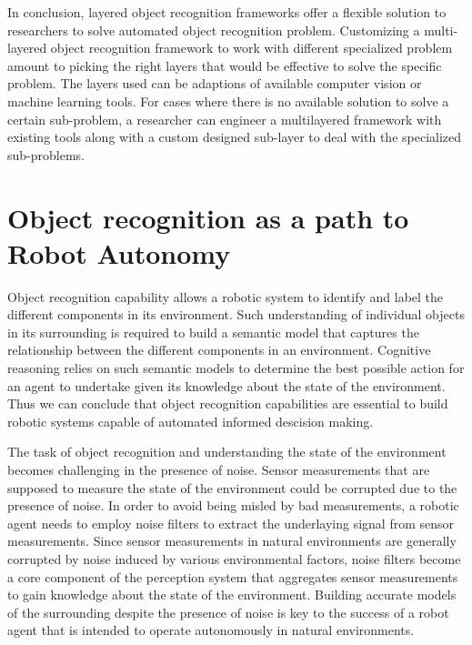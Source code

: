 \documentclass {udthesis}
\begin{document}
In conclusion, layered object recognition frameworks offer a flexible solution to researchers to solve automated object recognition problem. Customizing a multi-layered object recognition framework to work with different specialized problem amount to picking the right layers that would be effective to solve the specific problem. The layers used can be adaptions of available computer vision or machine learning tools. For cases where there is no available solution to solve a certain sub-problem, a researcher can engineer a multilayered framework with existing tools along with a custom designed sub-layer to deal with the specialized sub-problems.

\section{Object recognition as a path to Robot Autonomy}

Object recognition capability allows a robotic system to identify and label the different components in its environment. Such understanding of individual objects in its surrounding is required to build a semantic model that captures the relationship between the different components in an environment.
Cognitive reasoning relies on such semantic models to determine the best possible action for an agent to undertake given its knowledge about the state of the environment. Thus we can conclude that object recognition capabilities are essential to build robotic systems capable of automated informed descision making.

The task of object recognition and understanding the state of the environment becomes challenging in the presence of noise. Sensor measurements
that are supposed to measure the state of the environment could be corrupted due to the presence of noise. In order to avoid being misled by bad measurements,
a robotic agent needs to employ noise filters to extract the underlaying signal from sensor measurements. Since sensor measurements in natural environments are generally corrupted by noise induced by various environmental factors, noise filters become a core component of the perception system that aggregates sensor measurements to gain knowledge about the state of the environment. Building accurate models of the surrounding despite the presence of noise is key to the success of a robot agent that is intended to operate autonomously in natural environments.
\end{document}
